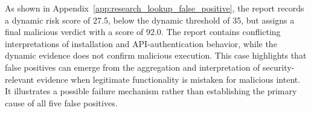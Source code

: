 As shown in
Appendix~\ref{app:research_lookup_false_positive},
the report records a dynamic risk score of 27.5,
below the dynamic threshold of 35, but assigns
a final malicious verdict with a score of 92.0.
The report contains conflicting interpretations of
installation and API-authentication behavior, while
the dynamic evidence does not confirm malicious
execution. This case highlights that false positives
can emerge from the aggregation and interpretation
of security-relevant evidence when legitimate
functionality is mistaken for malicious intent.
It illustrates a possible failure mechanism rather
than establishing the primary cause of all five
false positives. 




